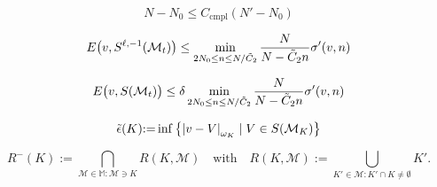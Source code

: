 \documentclass[a4paper]{article}
\begin{document}
\[
 N - N_0
 \leq
 {{C_\text{cmpl}}} (N' - N_0)
\]

\[
 E\big( v,{S}^{{\ell},-1}({\mathcal{M}}_t) \big)
 \leq
 \min_{2N_0 \leq n \leq N/\Tilde C_2}
   \frac{N}{N - \Tilde C_2 n} \sigma'(v,n)
\]

\[
 E\big( v,{S}({\mathcal{M}}_t) \big)
 \leq
 \delta \min_{2N_0 \leq n \leq N/\Tilde C_2}
   \frac{N}{N - \Tilde C_2 n} \sigma'(v,n)
\]

\[
 \Tilde{\epsilon}({K})
 {:=}
 \inf\big\{
  {\left|{v-V}\right|_{{\omega_{K}}}} \mid V\in{S}({\mathcal{M}}_{K})
  \big\}
\]

\[
 R^-({K})
 {:=}
 \bigcap_{{\mathcal{M}}\in{\mathbb{M}}:{\mathcal{M}}\ni{K}} R({K},{\mathcal{M}})
\quad\text{with}\quad
 R({K},{\mathcal{M}})
 {:=}
 \bigcup_{{K}'\in{\mathcal{M}}:{K}'\cap{K}\neq\emptyset} {K}'.
\]
\end{document}
